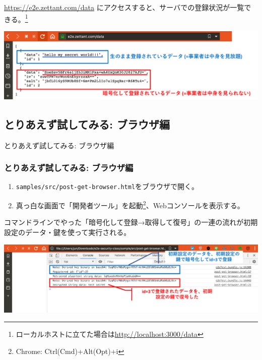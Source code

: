 \documentclass[12pt,dvipdfmx]{beamer}
\begin{document}
\begin{frame}
\url{https://e2e.zettant.com/data} にアクセスすると、サーバでの登録状況が一覧できる。\footnote[frame]{ローカルホストに立てた場合は\url{http://localhost:3000/data}}

\begin{center}
\includegraphics[width=\linewidth]{Figs/json_list.pdf}
\end{center}
\end{frame}

\subsection{とりあえず試してみる: ブラウザ編}
\begin{frame}
\centering
{\Large とりあえず試してみる: ブラウザ編}
\end{frame}

\begin{frame}
\frametitle{とりあえず試してみる: ブラウザ編}
\begin{enumerate}
 \item \texttt{samples/src/post-get-browser.html}をブラウザで開く。
 \item 真っ白な画面で「開発者ツール」を起動\footnote[frame]{Chrome: Ctrl(Cmd)+Alt(Opt)+i}、Webコンソールを表示する。
\end{enumerate}

コマンドラインでやった「暗号化して登録→取得して復号」の一連の流れが初期設定のデータ・鍵を使って実行される。

\begin{center}
\includegraphics[width=\linewidth]{Figs/browser-img1.pdf}
\end{center}

\end{frame}
\end{document}
